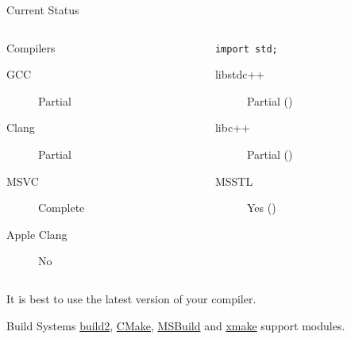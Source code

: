 \documentclass[aspectratio=169]{beamer}
\begin{document}
\begin{frame}{Current Status}
  \begin{columns}[t]
    \begin{column}{0.5\textwidth}
      \begin{block}{Compilers}
        \small
        \begin{description}
          \item[GCC] Partial 
          \item[Clang] Partial
          \item[MSVC] Complete
          \item[Apple Clang] No
        \end{description}
      \end{block}
    \end{column}

    \begin{column}{0.5\textwidth}
      \begin{block}{\texttt{import std;}}
        \small
        \begin{description}
          \item[libstdc++] Partial ()
          \item[libc++] Partial ()
          \item[MSSTL] Yes ()
        \end{description}
      \end{block}
    \end{column}
  \end{columns}
  It is best to use the latest version of your compiler.

  \vspace{1em}

  \begin{block}{Build Systems}
    \href{https://build2.org/}{build2}, \href{https://cmake.org/}{CMake},
    \href{https://learn.microsoft.com/en-us/visualstudio/msbuild/msbuild-command-line-reference?view=vs-2022}{MSBuild}
    and \href{https://xmake.io/}{xmake} support modules.
  \end{block}
\end{frame}
\end{document}
